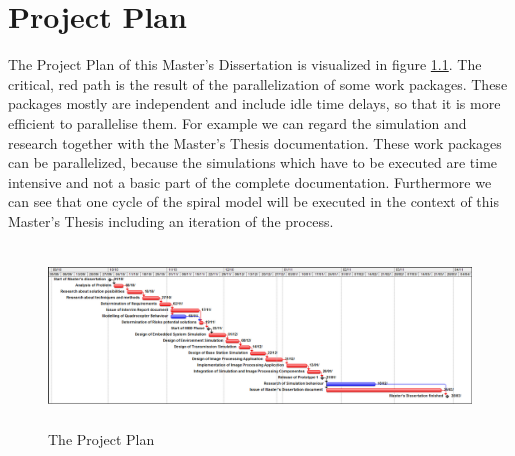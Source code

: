\chapter{Project Plan}

The Project Plan of this Master's Dissertation is visualized in figure
\ref{fig:ProjectPlan}. The critical, red path is the result of the
parallelization of some work packages. These packages mostly are independent and
include idle time delays, so that it is more efficient to parallelise them. For 
example we can regard the simulation and research together with the Master's Thesis documentation. These work packages can be parallelized, because the
simulations which have to be executed are time intensive and not a basic part of
the complete documentation. Furthermore we can see that one cycle of the spiral
model will be executed in the context of this Master's Thesis including an
iteration of the \MBD process.

\begin{figure}[!htbp]
	\centering
\includegraphics[width=1.1\textwidth, height=180px]{graphic/ProjectPlan.png}
\caption
{The Project Plan}
	\label{fig:ProjectPlan}
\end{figure}
